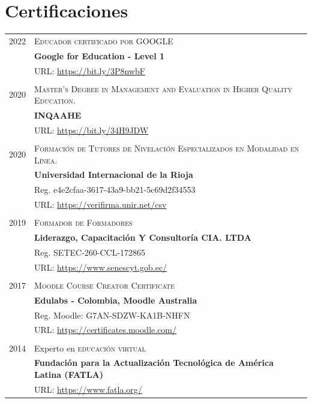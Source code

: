 \documentclass[a4paper]{article}
\begin{document}
\section{Certificaciones}
\begin{longtable}{r|p{12cm}}

\textsc{2022} & \textsc{Educador certificado por GOOGLE}\\
&\textbf{Google for Education - Level 1} \\
& URL: \url{https://bit.ly/3P8nwbF} \\

\multicolumn{2}{c}{} \\

\textsc{2020} & \textsc{Master’s Degree in Management and Evaluation in Higher Quality Education.}\\
&\textbf{INQAAHE} \\
& URL: \url{https://bit.ly/34H9JDW} \\

\multicolumn{2}{c}{} \\

\textsc{2020} & \textsc{Formación de Tutores de Nivelación Especializados en Modalidad en Línea.}\\
& \textbf{Universidad Internacional de la Rioja}\\
&  Reg. e4e2cfaa-3617-43a9-bb21-5c69d2f34553 \\
& URL: \url{https://verifirma.unir.net/csv} \\

\multicolumn{2}{c}{} \\

\textsc{2019} & \textsc{Formador de Formadores}\\&\textbf{Liderazgo,   Capacitación Y Consultoría CIA. LTDA} \\
& Reg. SETEC-260-CCL-172865 \\
& URL: \url{https://www.senescyt.gob.ec/} \\

\multicolumn{2}{c}{} \\

\textsc{2017} & \textsc{Moodle Course Creator Certificate}\\&\textbf{Edulabs - Colombia, Moodle Australia} \\
& Reg. Moodle: G7AN-SDZW-KA1B-NHFN \\
& URL: \url{https://certificates.moodle.com/} \\

\multicolumn{2}{c}{} \\

\textsc{2014}  & Experto en \textsc{ educación virtual} \\
&\textbf{Fundación para la Actualización Tecnológica de América Latina (FATLA)} \\
& URL: \href{https://www.flickr.com/search/?text=sotaminga}{https://www.fatla.org/} \\

\end{longtable}
\end{document}
